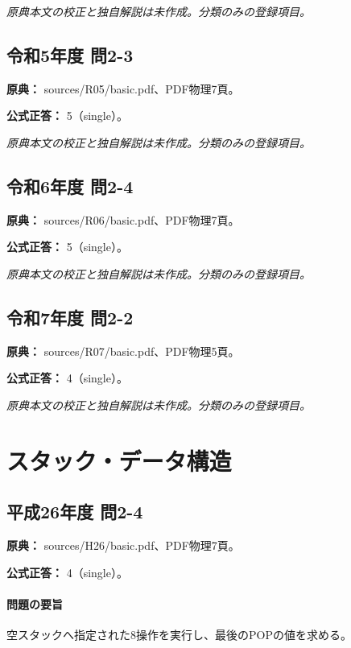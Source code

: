 \par\textit{原典本文の校正と独自解説は未作成。分類のみの登録項目。}

\subsection{令和5年度 問2-3}
\label{q:r05-reg-basic-2-3}

\noindent\textbf{原典：} sources/R05/basic.pdf、PDF物理7頁。

\textbf{公式正答：} 5（single）。

\par\textit{原典本文の校正と独自解説は未作成。分類のみの登録項目。}

\subsection{令和6年度 問2-4}
\label{q:r06-reg-basic-2-4}

\noindent\textbf{原典：} sources/R06/basic.pdf、PDF物理7頁。

\textbf{公式正答：} 5（single）。

\par\textit{原典本文の校正と独自解説は未作成。分類のみの登録項目。}

\subsection{令和7年度 問2-2}
\label{q:r07-reg-basic-2-2}

\noindent\textbf{原典：} sources/R07/basic.pdf、PDF物理5頁。

\textbf{公式正答：} 4（single）。

\par\textit{原典本文の校正と独自解説は未作成。分類のみの登録項目。}

\section{スタック・データ構造}

\subsection{平成26年度 問2-4}
\label{q:h26-reg-basic-2-4}

\noindent\textbf{原典：} sources/H26/basic.pdf、PDF物理7頁。

\textbf{公式正答：} 4（single）。

\paragraph{問題の要旨} 空スタックへ指定された8操作を実行し、最後のPOPの値を求める。

